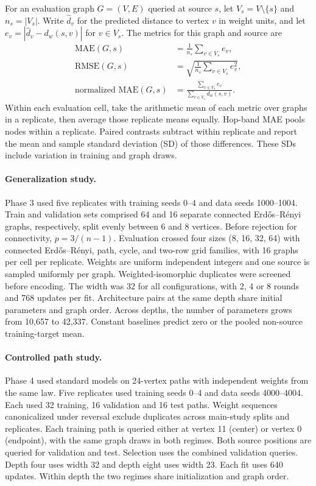 \documentclass[11pt]{article}
\begin{document}
For an evaluation graph \(G=(V,E)\) queried at source \(s\), let
\(V_s=V\setminus\{s\}\) and \(n_s=|V_s|\). Write \(\hat d_v\) for the
predicted distance to vertex \(v\) in weight units, and let
\(e_v=|\hat d_v-d_w(s,v)|\) for \(v\in V_s\). The metrics for this graph and source are
\begin{align*}
\mathrm{MAE}(G,s) &= \frac{1}{n_s}\sum_{v\in V_s} e_v, \\
\mathrm{RMSE}(G,s) &= \sqrt{\frac{1}{n_s}\sum_{v\in V_s} e_v^2}, \\
\text{normalized MAE}(G,s) &= \frac{\sum_{v\in V_s} e_v}{\sum_{v\in V_s} d_w(s,v)}.
\end{align*}
Within each evaluation cell, take the arithmetic mean of each metric over
graphs in a replicate, then average those replicate means equally. Hop-band MAE pools nodes within a replicate. Paired contrasts subtract within replicate and report the mean and sample standard deviation (SD) of those differences. These SDs include variation in training and graph draws.

\paragraph{Generalization study.}
Phase 3 used five replicates with training seeds 0--4 and data seeds 1000--1004. Train and validation sets comprised 64 and 16 separate connected Erd\H{o}s--R\'enyi graphs, respectively, split evenly between 6 and 8 vertices. Before rejection for connectivity, \(p=3/(n-1)\). Evaluation crossed four sizes (8, 16, 32, 64) with connected Erd\H{o}s--R\'enyi, path, cycle, and two-row grid families, with 16 graphs per cell per replicate. Weights are uniform independent integers and one source is sampled uniformly per graph. Weighted-isomorphic duplicates were screened before encoding. The width was 32 for all configurations, with 2, 4 or 8 rounds and 768 updates per fit. Architecture pairs at the same depth share initial parameters and graph order. Across depths, the number of parameters grows from 10,657 to 42,337. Constant baselines predict zero or the pooled non-source training-target mean.

\paragraph{Controlled path study.}
Phase 4 used standard models on 24-vertex paths with independent weights from the same law. Five replicates used training seeds 0--4 and data seeds 4000--4004. Each used 32 training, 16 validation and 16 test paths. Weight sequences canonicalized under reversal exclude duplicates across main-study splits and replicates. Each training path is queried either at vertex 11 (center) or vertex 0 (endpoint), with the same graph draws in both regimes. Both source positions are queried for validation and test. Selection uses the combined validation queries. Depth four uses width 32 and depth eight uses width 23. Each fit uses 640 updates. Within depth the two regimes share initialization and graph order.
\end{document}
